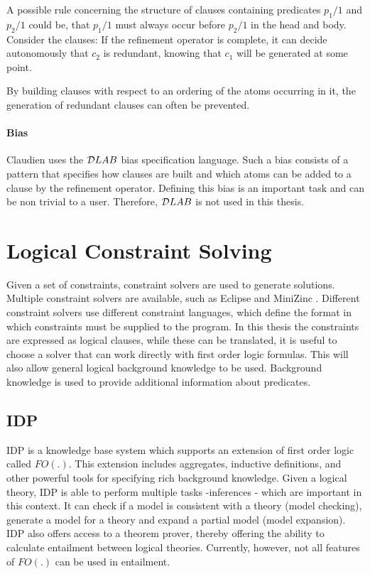 \begin{example}
A possible rule concerning the structure of clauses containing predicates $p_1/1$ and $p_2/1$ could be, that $p_1/1$ must always occur before $p_2/1$ in the head and body.
Consider the clauses:
If the refinement operator is complete, it can decide autonomously that $c_2$ is redundant, knowing that $c_1$ will be generated at some point.
\end{example}

By building clauses with respect to an ordering of the atoms occurring in it, the generation of redundant clauses can often be prevented.

\paragraph{Bias}
Claudien uses the $\mathcal{D}LAB$ bias specification language.
Such a bias consists of a pattern that specifies how clauses are built and which atoms can be added to a clause by the refinement operator.
Defining this bias is an important task and can be non trivial to a user.
Therefore, $\mathcal{D}LAB$ is not used in this thesis.

\section{Logical Constraint Solving}
\label{sec:logical_constraint_solving}
Given a set of constraints, constraint solvers are used to generate solutions.
Multiple constraint solvers are available, such as Eclipse \cite{apt2006constraint} and MiniZinc \cite{nethercote2007minizinc}.
Different constraint solvers use different constraint languages, which define the format in which constraints must be supplied to the program.
In this thesis the constraints are expressed as logical clauses, while these can be translated, it is useful to choose a solver that can work directly with first order logic formulas.
This will also allow general logical background knowledge to be used.
Background knowledge is used to provide additional information about predicates.

\subsection{IDP}
IDP \cite{de2013prototype,wittocx2008idp} is a knowledge base system which supports an extension of first order logic called $FO(.)$.
This extension includes aggregates, inductive definitions, and other powerful tools for specifying rich background knowledge.
Given a logical theory, IDP is able to perform multiple tasks -inferences - which are important in this context.
It can check if a model is consistent with a theory (model checking), generate a model for a theory and expand a partial model (model expansion).
IDP also offers access to a theorem prover, thereby offering the ability to calculate entailment between logical theories.
Currently, however, not all features of $FO(.)$ can be used in entailment.

